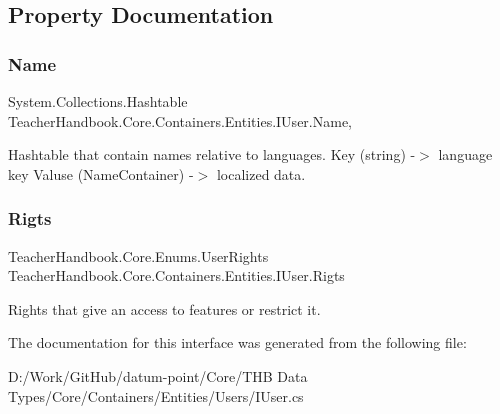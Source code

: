\subsection{Property Documentation}
\mbox{\label{interface_teacher_handbook_1_1_core_1_1_containers_1_1_entities_1_1_i_user_a528fbfbe0effa7e8683cb892b08c4c64}} 
\subsubsection{\texorpdfstring{Name}{Name}}
{\footnotesize\ttfamily System.\+Collections.\+Hashtable Teacher\+Handbook.\+Core.\+Containers.\+Entities.\+I\+User.\+Name\hspace{0.3cm}{\ttfamily [get]}, {\ttfamily [set]}}



Hashtable that contain names relative to languages. Key (string) -\/$>$ language key Valuse (Name\+Container) -\/$>$ localized data. 

\mbox{\label{interface_teacher_handbook_1_1_core_1_1_containers_1_1_entities_1_1_i_user_a147a0793a5587c93da634d0c997e13ec}} 
\subsubsection{\texorpdfstring{Rigts}{Rigts}}
{\footnotesize\ttfamily Teacher\+Handbook.\+Core.\+Enums.\+User\+Rights Teacher\+Handbook.\+Core.\+Containers.\+Entities.\+I\+User.\+Rigts\hspace{0.3cm}{\ttfamily [get]}}



Rights that give an access to features or restrict it. 



The documentation for this interface was generated from the following file\+:\begin{DoxyCompactItemize}
\item 
D\+:/\+Work/\+Git\+Hub/datum-\/point/\+Core/\+T\+H\+B Data Types/\+Core/\+Containers/\+Entities/\+Users/I\+User.\+cs\end{DoxyCompactItemize}
